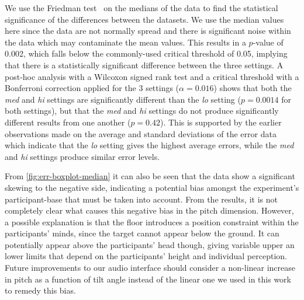 \documentclass[sigconf, screen=true, anonymous=true]{acmart}
\begin{document}
We use the Friedman test~\cite{friedman1937use} on the medians of the data to find the statistical significance of the differences between the datasets.
We use the median values here since the data are not normally spread and there is significant noise within the data which may contaminate the mean values.
This results in a $p$-value of 0.002, which falls below the commonly-used critical threshold of 0.05, implying that there is a statistically significant difference between the three settings.
A post-hoc analysis with a Wilcoxon signed rank test and a critical threshold with a Bonferroni correction applied for the 3 settings ($\alpha=0.016$) shows that both the \emph{med} and \emph{hi} settings are significantly different than the \emph{lo} setting ($p=0.0014$ for both settings), but that the \emph{med} and \emph{hi} settings do not produce significantly different results from one another ($p=0.42$).
This is supported by the earlier observations made on the average and standard deviations of the error data which indicate that the \emph{lo} setting gives the highest average errors, while the \emph{med} and \emph{hi} settings produce similar error levels. 

From \cref{fig:err-boxplot-median} it can also be seen that the data show a significant skewing to the negative side, indicating a potential bias amongst the experiment's participant-base that must be taken into account.
From the results, it is not completely clear what causes this negative bias in the pitch dimension.
However, a possible explanation is that the floor introduces a position constraint within the participants' minds, since the target cannot appear below the ground.
It can potentially appear above the participants' head though, giving variable upper an lower limits that depend on the participants' height and individual perception.
Future improvements to our audio interface should consider a non-linear increase in pitch as a function of tilt angle instead of the linear one we used in this work to remedy this bias.

\end{document}
